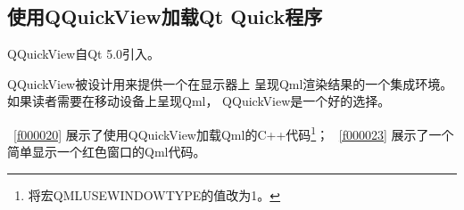 \FloatBarrier
\subsection{
使用QQuickView加载Qt Quick程序
}\label{ss001010}


QQuickView自Qt 5.0引入。

QQuickView被设计用来提供一个在显示器上
呈现Qml渲染结果的一个集成环境。
如果读者需要在移动设备上呈现Qml，
QQuickView是一个好的选择。

\filesourcenumbernameone\ \ref{f000020}
展示了使用QQuickView加载Qml的C{\sourcefonttwo{}+}{\sourcefonttwo{}+}代码\footnote{
将宏QML\underline{\hspace{0.5em}}USE\underline{\hspace{0.5em}}WINDOW\underline{\hspace{0.5em}}TYPE的值改为1。
}；
\filesourcenumbernameone\ \ref{f000023}
展示了一个简单显示一个红色窗口的Qml代码。

